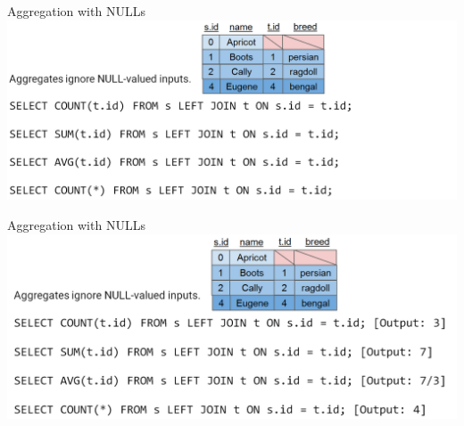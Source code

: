 \documentclass[aspectratio=169]{../latex_main/tntbeamer}  %
\begin{document}
	
	
	\begin{frame}{Aggregation with NULLs}
	    \includegraphics[scale=.43]{Bild25}
	\end{frame}
	
	
	
	
	\begin{frame}{Aggregation with NULLs}
	    \includegraphics[scale=.43]{Bild26}
	\end{frame}
\end{document}
